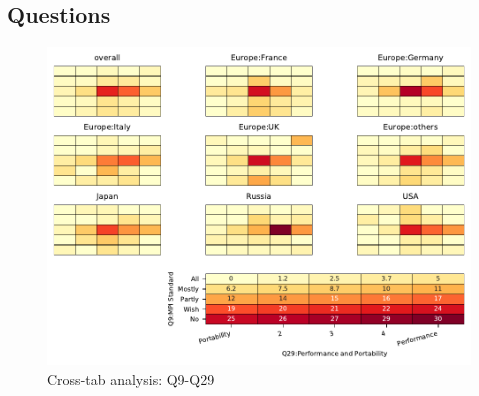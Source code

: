 
\subsection{Questions}


\begin{figure}
\begin{center}
\includegraphics[width=12cm]{../pdfs/Q9-Q29.pdf}
\caption{Cross-tab analysis: Q9-Q29}
\label{fig:Q9-Q29}
\end{center}
\end{figure}
